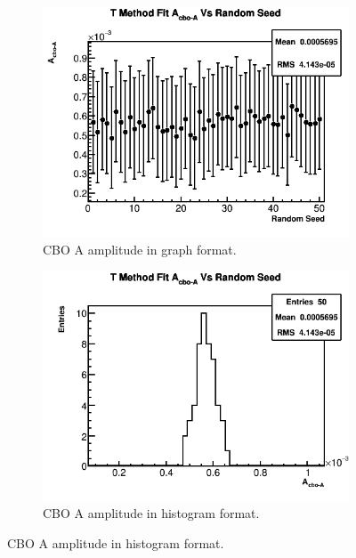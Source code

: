 	\begin{figure}[]
	\centering
	    \begin{subfigure}[t]{0.45\textwidth}
		    \centering
			\includegraphics[width=\textwidth]{TMethod_A_cbo-A_Vs_Iter_Canv}
		    \caption{CBO A amplitude in graph format.}
	    \end{subfigure}
	    \hspace{4mm}
	    \begin{subfigure}[t]{0.45\textwidth}
		    \centering
			\includegraphics[width=\textwidth]{TMethod_A_cbo-A_Vs_Iter_Canv_hist}
		    \caption{CBO A amplitude in histogram format.}
	    \end{subfigure}%

\end{figure}
